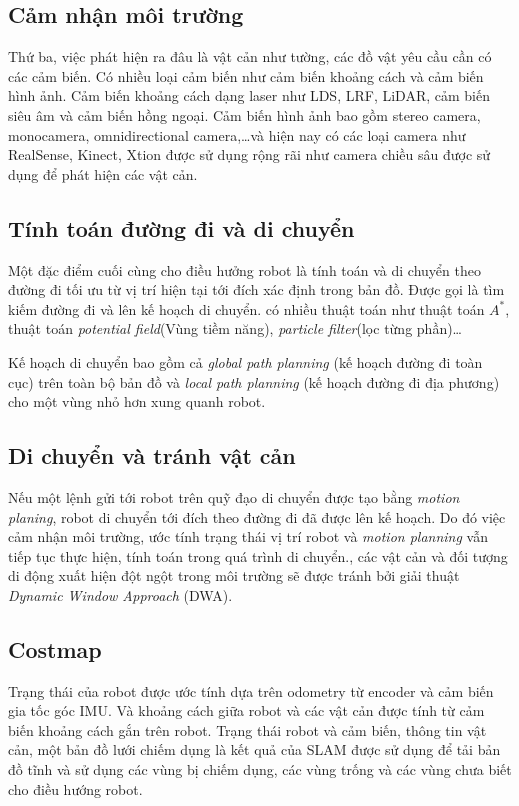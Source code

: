 \subsection*{Cảm nhận môi trường}
Thứ ba, việc phát hiện ra đâu là vật cản như tường, các đồ vật yêu cầu cần có các cảm biến. Có nhiều loại cảm biến như cảm biến khoảng cách và cảm biến hình ảnh. Cảm biến khoảng cách dạng laser như LDS, LRF, LiDAR, cảm biến siêu âm và cảm biến hồng ngoại. Cảm biến hình ảnh bao gồm stereo camera, monocamera, omnidirectional camera,\dots và hiện nay có các loại camera như RealSense, Kinect, Xtion được sử dụng rộng rãi như camera chiều sâu được sử dụng để phát hiện các vật cản.

\subsection*{Tính toán đường đi và di chuyển}
Một đặc điểm cuối cùng cho điều hưởng robot là tính toán và di chuyển theo đường đi tối ưu từ vị trí hiện tại tới đích xác định trong bản đồ. Được gọi là tìm kiếm đường đi và lên kế hoạch di chuyển. có nhiều thuật toán như thuật toán ${A}^{*}$, thuật toán \textit{potential field}(Vùng tiềm năng), \textit{particle filter}(lọc từng phần)\dots

Kế hoạch di chuyển bao gồm cả \textit{global path planning} (kế hoạch đường đi toàn cục) trên toàn bộ bản đồ và \textit{local path planning} (kế hoạch đường đi địa phương) cho một vùng nhỏ hơn xung quanh robot.

\subsection*{Di chuyển và tránh vật cản}
Nếu một lệnh gửi tới robot trên quỹ đạo di chuyển được tạo bằng \textit{motion planing}, robot di chuyển tới đích theo đường đi đã được lên kế hoạch. Do đó việc cảm nhận môi trường, ước tính trạng thái vị trí robot và \textit{motion planning} vẫn tiếp tục thực hiện, tính toán trong quá trình di chuyển., các vật cản và đối tượng di động xuất hiện đột ngột trong môi trường sẽ được tránh bởi giải thuật \textit{Dynamic Window Approach} (DWA).

\subsection{Costmap}

Trạng thái của robot được ước tính dựa trên odometry từ encoder và cảm biến gia tốc góc IMU. Và khoảng cách giữa robot và các vật cản được tính từ cảm biến khoảng cách gắn trên robot. Trạng thái robot và cảm biến, thông tin vật cản, một bản đồ lưới chiếm dụng là kết quả của SLAM được sử dụng để tải bản đồ tĩnh và sử dụng các vùng bị chiếm dụng, các vùng trống và các vùng chưa biết cho điều hướng robot.

